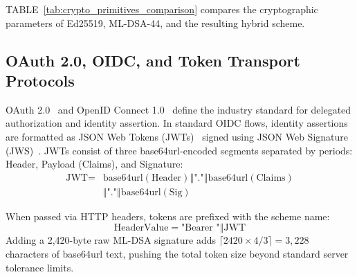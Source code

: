 \documentclass[conference]{IEEEtran}
\begin{document}
TABLE~\ref{tab:crypto_primitives_comparison} compares the cryptographic parameters of Ed25519, ML-DSA-44, and the resulting hybrid scheme.

\begin{table}[htbp]
\caption{Cryptographic Parameters of Primitives in DilithiAuth}
\label{tab:crypto_primitives_comparison}
\centering
{}
\end{table}

\subsection{OAuth 2.0, OIDC, and Token Transport Protocols}
OAuth 2.0~\cite{rfc6749,rfc6750} and OpenID Connect 1.0~\cite{oidc_core} define the industry standard for delegated authorization and identity assertion. In standard OIDC flows, identity assertions are formatted as JSON Web Tokens (JWTs)~\cite{rfc7519} signed using JSON Web Signature (JWS)~\cite{rfc7515}. JWTs consist of three base64url-encoded segments separated by periods: Header, Payload (Claims), and Signature:
\begin{equation}
\begin{split}
\text{JWT} = {} & \text{base64url}(\text{Header}) \mathbin{\Vert} \text{"."} \mathbin{\Vert} \text{base64url}(\text{Claims}) \\
& \mathbin{\Vert} \text{"."} \mathbin{\Vert} \text{base64url}(\text{Sig})
\end{split}
\end{equation}

When passed via HTTP headers, tokens are prefixed with the scheme name:
\begin{equation}
\text{HeaderValue} = \text{"Bearer "} \mathbin{\Vert} \text{JWT}
\end{equation}
Adding a 2,420-byte raw ML-DSA signature adds $\lceil 2420 \times 4/3 \rceil = 3,228$ characters of base64url text, pushing the total token size beyond standard server tolerance limits.
\end{document}
